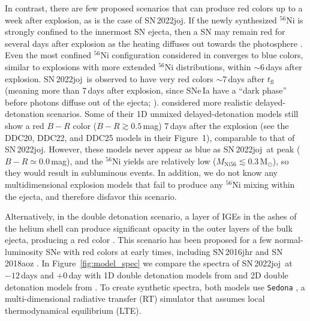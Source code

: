\documentclass[twocolumn]{aastex631}
\newcommand{\sn}{SN\,2022joj}
\begin{document}
\begin{CJK*}{UTF8}{gbsn}
In contrast, there are few proposed scenarios that can produce red colors up to a week after explosion, as is the case of \sn. If the newly synthesized $^{56}$Ni is strongly confined to the innermost SN ejecta, then a SN may remain red for several days after explosion as the heating diffuses out towards the photosphere \citep{Piro_2016}. Even the most confined $^{56}$Ni configuration considered in \citet{Piro_2016} converges to blue colors, similar to explosions with more extended $^{56}$Ni distributions, within $\sim$6\,days after explosion. \sn\ is observed to have very red colors $\sim$7\,days after $t_\mathrm{fl}$ (meaning more than 7\,days after explosion, since SNe\,Ia have a ``dark phase'' before photons diffuse out of the ejecta; \citealt{Piro_2013}). \citet{Dessart_2014} considered more realistic delayed-detonation scenarios. Some of their 1D unmixed delayed-detonation models still show a red $B-R$ color ($B-R\gtrsim0.5$\,mag) 7\,days after the explosion (see the DDC20, DDC22, and DDC25 models in their Figure~1), comparable to that of \sn. However, these models never appear as blue as \sn\ at peak ($B-R\simeq0.0$\,mag), and the $^{56}$Ni yields are relatively low ($M_\mathrm{Ni56}\lesssim0.3\,\mathrm{M_\odot}$), so they would result in subluminous events. In addition, we do not know any multidimensional explosion models that fail to produce any $^{56}$Ni mixing within the ejecta, and therefore disfavor this scenario.

Alternatively, in the double detonation scenario, a layer of IGEs in the ashes of the helium shell can produce significant opacity in the outer layers of the bulk ejecta, producing a red color \citep{polin_observational_2019}. This scenario has been proposed for a few normal-luminosity SNe with red colors at early times, including SN\,2016jhr \citep{jiang_16jhr_2017} and SN\,2018aoz \citep{Ni_2022}. In Figure~\ref{fig:model_spec} we compare the spectra of \sn\ at $-12$\,days and $+0$\,day with 1D double detonation models from \citet{polin_observational_2019} and 2D double detonation models from \citet{Shen_2D_2021}. To create synthetic spectra, both models use \texttt{Sedona} \citep{Kasen_Sedona_2006}, a multi-dimensional radiative transfer (RT) simulator that assumes local thermodynamical equilibrium (LTE).


\end{CJK*}
\end{document}
